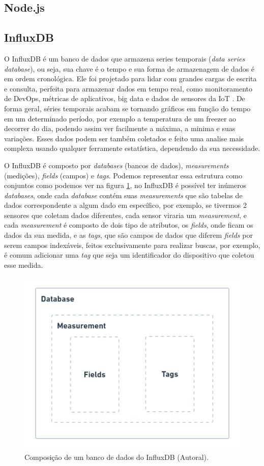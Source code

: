 \subsection{Node.js}
\label{fund:node}

\subsection{InfluxDB}
\label{fund:influxdb}
O InfluxDB é um banco de dados que armazena series temporais (\textit{data series database}), ou seja, sua chave é o tempo e sua forma de armazenagem de dados é em ordem cronológica. Ele foi projetado para lidar com grandes cargas de escrita e consulta, perfeita para armazenar dados em tempo real, como monitoramento de DevOps, métricas de aplicativos, big data e dados de sensores da IoT \cite{giacobbe2018implementation}. De forma geral, séries temporais acabam se tornando gráficos em função do tempo em um determinado período, por exemplo a temperatura de um freezer ao decorrer do dia, podendo assim ver facilmente a máxima, a minima e suas variações. Esses dados podem ser também coletados e feito uma analise mais complexa usando qualquer ferramente estatística, dependendo da sua necessidade.

O InfluxDB é composto por \textit{databases} (bancos de dados), \textit{measurements} (medições), \textit{fields} (campos) e \textit{tags}. Podemos representar essa estrutura como conjuntos como podemos ver na figura \ref{fig:influxdb-struct}, no InfluxDB é possível ter inúmeros \textit{databases}, onde cada \textit{database} contém suas \textit{measurements} que são tabelas de dados correspondente a algum dado em específico, por exemplo, se tivermos 2 sensores que coletam dados diferentes, cada sensor viraria um \textit{measurement}, e cada \textit{measurement} é composto  de dois tipo de atributos, os \textit{fields}, onde ficam os dados da sua medida, e as \textit{tags}, que são campos de dados que diferem \textit{fields} por serem campos indexáveis, feitos exclusivamente para realizar buscas, por exemplo, é comum adicionar uma \textit{tag} que seja um identificador do dispositivo que coletou esse medida.

\begin{figure}[H]
\centering
\includegraphics[width=.80\textwidth]{assets/influxdb-struct.png} 
\caption{Composição de um banco de dados do InfluxDB (Autoral).}
\label{fig:influxdb-struct} 
\end{figure}

